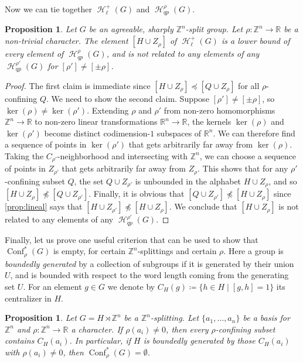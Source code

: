 \documentclass[reqno,12pt]{amsart}\setcounter{tocdepth}{1}
\newtheorem{proposition}[theorem]{Proposition}
\theoremstyle{definition}
\newcommand{\Z}{\mathbb{Z}}
\newcommand{\R}{\mathbb{R}}
\DeclareMathOperator{\Hyp}{\mathcal{H}}
\DeclareMathOperator{\Conf}{Conf}
\numberwithin{equation}{section}
\begin{document}
Now we can tie together $\Hyp_\ell^+(G)$ and $\Hyp_{qp}^\rho(G)$.

\begin{proposition}\label{prop:linvsqp}
Let $G$ be an agreeable, sharply $\Z^n$-split group. Let $\rho \colon \Z^n \to \R$ be a non-trivial character. The element $[H\cup Z_\rho]$ of $\Hyp_\ell^+(G)$ is a lower bound of every element of $\Hyp_{qp}^\rho(G)$, and is not related to any elements of any $\Hyp_{qp}^{\rho'}(G)$ for $[\rho']\ne[\pm\rho]$.
\end{proposition}

\begin{proof}
The first claim is immediate since $[H\cup Z_\rho]\preccurlyeq [Q\cup Z_\rho]$ for all $\rho$-confining $Q$. We need to show the second claim. Suppose $[\rho']\ne [\pm\rho]$, so $\ker(\rho)\ne\ker(\rho')$. Extending $\rho$ and $\rho'$ from non-zero homomorphisms $\Z^n\to\R$ to non-zero linear transformations $\R^n\to\R$, the kernels $\ker(\rho)$ and $\ker(\rho')$ become distinct codimension-$1$ subspaces of $\R^n$. We can therefore find a sequence of points in $\ker(\rho')$ that gets arbitrarily far away from $\ker(\rho)$. Taking the $C_{\rho'}$-neighborhood and intersecting with $\Z^n$, we can choose a sequence of points in $Z_{\rho'}$ that gets arbitrarily far away from $Z_\rho$. This shows that for any $\rho'$-confining subset $Q$, the set $Q\cup Z_{\rho'}$ is unbounded in the alphabet $H\cup Z_{\rho}$, and so $[H\cup Z_\rho]\not\preccurlyeq[Q\cup Z_{\rho'}]$. Finally, it is obvious that $[Q\cup Z_{\rho'}]\not\preccurlyeq[H\cup Z_\rho]$ since \cref{prop:lineal} says that $[H\cup Z_{\rho'}]\not\preccurlyeq [H\cup Z_\rho]$. We conclude that $[H\cup Z_\rho]$ is not related to any elements of any $\Hyp_{qp}^{\rho'}(G)$.
\end{proof}

Finally, let us prove one useful criterion that can be used to show that $\Conf^\ast_\rho(G)$ is empty, for certain $\Z^n$-splittings and certain $\rho$. Here a group is \emph{boundedly generated} by a collection of subgroups if it is generated by their union $U$, and is bounded with respect to the word length coming from the generating set $U$. For an element $g \in G$ we denote by $C_H(g) \coloneqq \{ h \in H \mid [g, h] = 1 \}$ its centralizer in $H$.

\begin{proposition}
\label{prop:empty_conf}
Let $G = H \rtimes \Z^n$ be a $\Z^n$-splitting. Let $\{a_1,\dots,a_n\}$ be a basis for $\Z^n$ and $\rho\colon \Z^n \to \R$ a character. If $\rho(a_i) \neq 0$, then every $\rho$-confining subset contains $C_H(a_i)$. In particular, if $H$ is boundedly generated by those $C_H(a_i)$ with $\rho(a_i)\ne 0$, then $\Conf^\ast_\rho(G)= \emptyset$.
\end{proposition}
\end{document}
